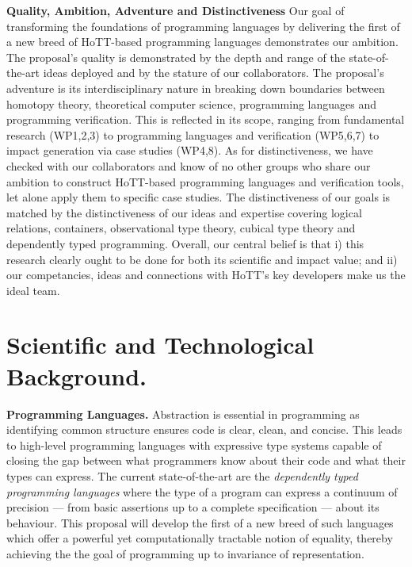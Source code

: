\documentclass[a4paper,11pt]{article}
\begin{document}
  {\bf Quality, Ambition, Adventure and Distinctiveness} Our goal of
  transforming the foundations of programming languages by
  delivering the first of a new breed of HoTT-based programming languages
demonstrates our ambition. The
  proposal's quality is demonstrated by the depth and range of the
  state-of-the-art ideas deployed and by the stature of our
  collaborators. The proposal's adventure is its interdisciplinary
  nature in breaking down boundaries between homotopy theory, theoretical
  computer science, programming languages and programming
  verification. This is reflected in its scope, ranging from
  fundamental research (WP1,2,3) to programming languages and
  verification (WP5,6,7) to impact generation via case studies
  (WP4,8). As for distinctiveness, we have checked with our
  collaborators and know of no other groups who share our ambition to
  construct HoTT-based programming languages and verification tools,
  let alone apply them to specific case studies. The distinctiveness of our goals is
  matched by the distinctiveness of our ideas and expertise covering
  logical relations, containers, observational type theory, cubical
  type theory and dependently typed programming. Overall, our
  central belief is that i) this research clearly ought to be
  done for both its scientific and impact value; and
   ii) our competancies, ideas and connections with HoTT's key developers
  make us the ideal team.



\vspace*{-0.1in} 



\vspace*{-0.1in} 
\section{Scientific and Technological Background.}
\vspace*{-0.1in} 

{\bf Programming Languages.} Abstraction is essential in programming
as identifying common structure ensures code is clear, clean, and
concise. This leads to high-level programming languages with
expressive type systems capable of closing the gap between what
programmers know about their code and what their types can express.
The current state-of-the-art are the {\em dependently typed
  programming languages} where the type of a program can express a
continuum of precision --- from basic assertions up to a complete
specification --- about its behaviour. This proposal will develop the
first of a new breed of such languages which offer a powerful yet
computationally tractable notion of equality, thereby achieving the
the goal of programming up to invariance of representation.
\end{document}

